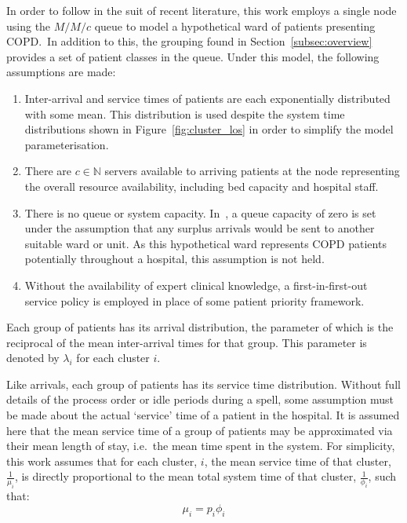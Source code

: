 In order to follow in the suit of recent literature, this work employs a single
node using the \(M/M/c\) queue to model a hypothetical ward of patients
presenting COPD.\ In addition to this, the grouping found in
Section~\ref{subsec:overview} provides a set of patient classes in the queue.
Under this model, the following assumptions are made:
\begin{enumerate}
    \item Inter-arrival and service times of patients are each exponentially
        distributed with some mean. This distribution is used despite the system
        time distributions shown in Figure~\ref{fig:cluster_los} in order to
        simplify the model parameterisation.
    \item There are \(c \in \mathbb{N}\) servers available to arriving patients
        at the node representing the overall resource availability, including
        bed capacity and hospital staff.
    \item There is no queue or system capacity. In~\cite{Williams2015}, a
        queue capacity of zero is set under the assumption that any surplus
        arrivals would be sent to another suitable ward or unit. As this
        hypothetical ward represents COPD patients potentially throughout a
        hospital, this assumption is not held.
    \item Without the availability of expert clinical knowledge, a
        first-in-first-out service policy is employed in place of some patient
        priority framework.
\end{enumerate}

Each group of patients has its arrival distribution, the parameter of which is
the reciprocal of the mean inter-arrival times for that group. This parameter
is denoted by \(\lambda_i\) for each cluster \(i\).

Like arrivals, each group of patients has its service time distribution.
Without full details of the process order or idle periods during a spell, some
assumption must be made about the actual `service' time of a patient in the
hospital. It is assumed here that the mean service time of a group of patients
may be approximated via their mean length of stay, i.e.\ the mean time spent in
the system. For simplicity, this work assumes that for each cluster, \(i\), the
mean service time of that cluster, \(\frac{1}{\mu_i}\), is directly proportional
to the mean total system time of that cluster, \(\frac{1}{\phi_i}\), such that:
\begin{equation}\label{eq:services}
    \mu_i = p_i \phi_i
\end{equation}

